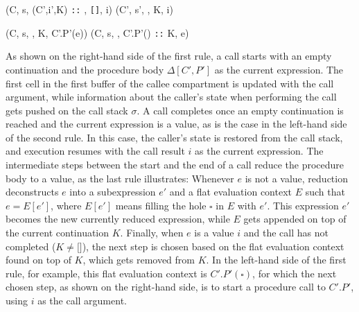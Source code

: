 \documentclass[10pt, conference, compsocconf, letterpaper, times]{IEEEtran}
\begin{document}
 {\Delta \vdash (C, s, (C',i',K) \texttt{::} \sigma, \texttt{[]}, i) \rightarrow (C', s', \sigma, K, i)}

\infrule[]
  {}
  {\Delta \vdash (C, s, \sigma, K, C'.P'(e)) \rightarrow (C, s, \sigma, C'.P'(\square) \texttt{::} K, e)}

As shown on the right-hand side of the first rule, a call starts with
an empty continuation and the procedure body $\Delta[C',P']$ as the
current expression.
The first cell in the first buffer of the callee compartment is
updated with the call argument, while information about the caller's
state when performing the call gets pushed on the call stack $\sigma$.
A call completes once an empty continuation is reached and the current
expression is a value, as is the case in the left-hand side
of the second rule.
In this case, the caller's state is restored from the call stack, and
execution resumes with the call result $i$ as the current expression.
The intermediate steps between the start and the end of a call reduce
the procedure body to a value, as the last rule illustrates:
Whenever $e$ is not a value, reduction deconstructs $e$ into a
subexpression $e'$ and a flat evaluation context $E$ such that
$e = E[e']$, where $E[e']$ means filling the hole $\square$ in $E$
with $e'$.
This expression $e'$ becomes the new currently reduced expression,
while $E$ gets appended on top of the current continuation $K$.
Finally, when $e$ is a value $i$ and the call has not completed
($K \neq \texttt{[]}$), the next step is chosen
based on the flat evaluation context found on top of $K$,
which gets removed from $K$.
In the left-hand side of the first rule, for example, this flat
evaluation context is $C'.P'(\square)$, for which the next chosen
step, as shown on the right-hand side, is to start a procedure call to
$C'.P'$, using $i$ as the call argument.
\end{document}
